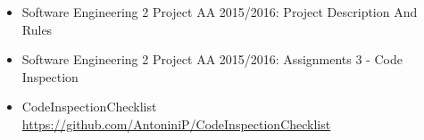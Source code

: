 \begin{itemize}
	\item Software Engineering 2 Project AA 2015/2016: Project Description And Rules
	\item Software Engineering 2 Project AA 2015/2016: Assignments 3 - Code Inspection
	\item CodeInspectionChecklist \url{https://github.com/AntoniniP/CodeInspectionChecklist}
	
\end{itemize}